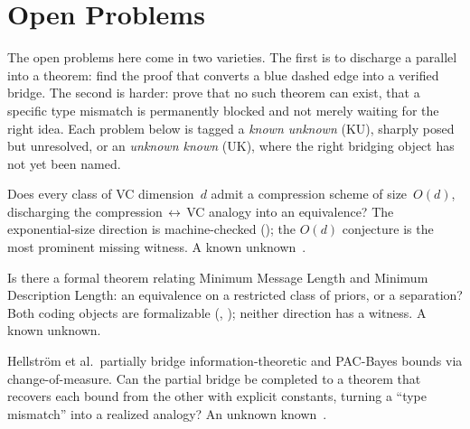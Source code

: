 
\section{Open Problems}
\label{sec:analogies-open}

The open problems here come in two varieties. The first is to discharge a
parallel into a theorem: find the proof that converts a blue dashed edge
into a verified bridge. The second is harder: prove that no such theorem
can exist, that a specific type mismatch is permanently blocked and not
merely waiting for the right idea. Each problem below is tagged a
\emph{known unknown} (KU), sharply posed but unresolved, or an
\emph{unknown known} (UK), where the right bridging object has not yet
been named.

\begin{openprob}
\label{op:compression-vc-analogy}
Does every class of VC dimension~$d$ admit a compression scheme of
size~$O(d)$, discharging the compression$\,\leftrightarrow\,$VC analogy
into an equivalence?  The exponential-size direction is machine-checked
(); the $O(d)$ conjecture is the most
prominent missing witness.  A known unknown~\cite{MoranYehudayoff2016}.
\end{openprob}

\begin{openprob}
\label{op:mml-mdl}
Is there a formal theorem relating Minimum Message Length and Minimum
Description Length: an equivalence on a restricted class of priors, or a
separation?  Both coding objects are formalizable (,
); neither direction has a witness.  A known
unknown.
\end{openprob}

\begin{openprob}
\label{op:itb-pacbayes-bridge}
Hellstr\"om et al.\ partially bridge information-theoretic and PAC-Bayes
bounds via change-of-measure.  Can the partial bridge be completed to a
theorem that recovers each bound from the other with explicit constants,
turning a ``type mismatch'' into a realized analogy?  An unknown
known~\cite{HellstromDurisi2020}.
\end{openprob}

